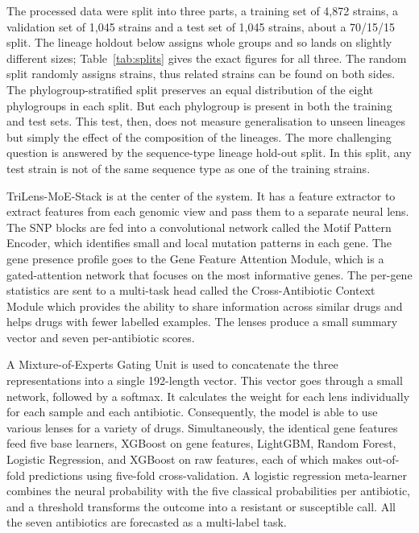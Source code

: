 \documentclass[journal]{IEEEtran}
\begin{document}
The processed data were split into three parts, a training set of 4{,}872 strains,
a validation set of 1{,}045 strains and a test set of 1{,}045 strains, about a
70/15/15 split. The lineage holdout below assigns whole groups and so lands on
slightly different sizes; Table~\ref{tab:splits} gives the exact figures for all
three. The random split randomly assigns strains, thus related strains can be found
on both sides. The phylogroup-stratified split preserves an equal distribution of
the eight phylogroups in each split. But each phylogroup is present in both the
training and test sets. This test, then, does not measure generalisation to unseen
lineages but simply the effect of the composition of the lineages. The more
challenging question is answered by the sequence-type lineage hold-out split. In
this split, any test strain is not of the same sequence type as one of the training
strains.

TriLens-MoE-Stack is at the center of the system. It has a feature extractor to
extract features from each genomic view and pass them to a separate neural lens.
The SNP blocks are fed into a convolutional network called the Motif Pattern
Encoder, which identifies small and local mutation patterns in each gene. The gene
presence profile goes to the Gene Feature Attention Module, which is a
gated-attention network that focuses on the most informative genes. The per-gene
statistics are sent to a multi-task head called the Cross-Antibiotic Context Module
which provides the ability to share information across similar drugs and helps
drugs with fewer labelled examples. The lenses produce a small summary vector and
seven per-antibiotic scores.

A Mixture-of-Experts Gating Unit is used to concatenate the three representations
into a single 192-length vector. This vector goes through a small network, followed
by a softmax. It calculates the weight for each lens individually for each sample
and each antibiotic. Consequently, the model is able to use various lenses for a
variety of drugs. Simultaneously, the identical gene features feed five base
learners, XGBoost on gene features, LightGBM, Random Forest, Logistic Regression,
and XGBoost on raw features, each of which makes out-of-fold predictions using
five-fold cross-validation. A logistic regression meta-learner combines the neural
probability with the five classical probabilities per antibiotic, and a threshold
transforms the outcome into a resistant or susceptible call. All the seven
antibiotics are forecasted as a multi-label task.
\end{document}

